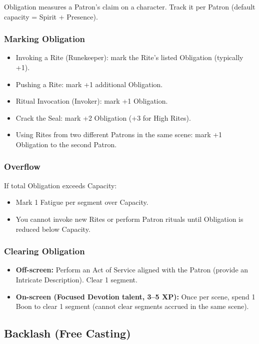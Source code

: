 Obligation measures a Patron's claim on a character. Track it per Patron (default capacity = Spirit + Presence).

\subsubsection{Marking Obligation}
\begin{itemize}
  \item Invoking a Rite (Runekeeper): mark the Rite's listed Obligation (typically +1).
  \item Pushing a Rite: mark +1 additional Obligation.
  \item Ritual Invocation (Invoker): mark +1 Obligation.
  \item Crack the Seal: mark +2 Obligation (+3 for High Rites).
  \item Using Rites from two different Patrons in the same scene: mark +1 Obligation to the second Patron.
\end{itemize}

\subsubsection{Overflow}
If total Obligation exceeds Capacity:
\begin{itemize}
  \item Mark 1 Fatigue per segment over Capacity.
  \item You cannot invoke new Rites or perform Patron rituals until Obligation is reduced below Capacity.
\end{itemize}

\subsubsection{Clearing Obligation}
\begin{itemize}
  \item \textbf{Off-screen:} Perform an Act of Service aligned with the Patron (provide an Intricate Description). Clear 1 segment.
  \item \textbf{On-screen (Focused Devotion talent, 3–5 XP):} Once per scene, spend 1 Boon to clear 1 segment (cannot clear segments accrued in the same scene).
\end{itemize}

\subsection{Backlash (Free Casting)}

